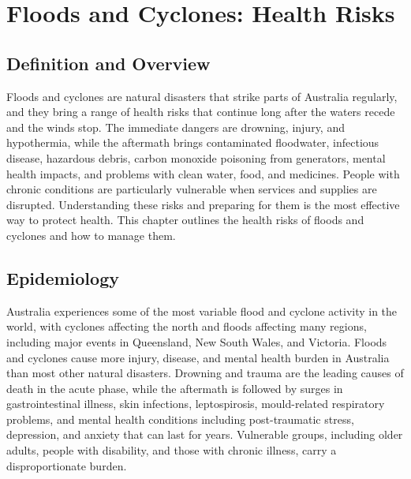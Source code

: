 \chapter{Floods and Cyclones: Health Risks}

\section*{Definition and Overview}
Floods and cyclones are natural disasters that strike parts of Australia regularly, and they bring a range of health risks that continue long after the waters recede and the winds stop. The immediate dangers are drowning, injury, and hypothermia, while the aftermath brings contaminated floodwater, infectious disease, hazardous debris, carbon monoxide poisoning from generators, mental health impacts, and problems with clean water, food, and medicines. People with chronic conditions are particularly vulnerable when services and supplies are disrupted. Understanding these risks and preparing for them is the most effective way to protect health. This chapter outlines the health risks of floods and cyclones and how to manage them.

\section*{Epidemiology}
Australia experiences some of the most variable flood and cyclone activity in the world, with cyclones affecting the north and floods affecting many regions, including major events in Queensland, New South Wales, and Victoria. Floods and cyclones cause more injury, disease, and mental health burden in Australia than most other natural disasters. Drowning and trauma are the leading causes of death in the acute phase, while the aftermath is followed by surges in gastrointestinal illness, skin infections, leptospirosis, mould-related respiratory problems, and mental health conditions including post-traumatic stress, depression, and anxiety that can last for years. Vulnerable groups, including older adults, people with disability, and those with chronic illness, carry a disproportionate burden.

